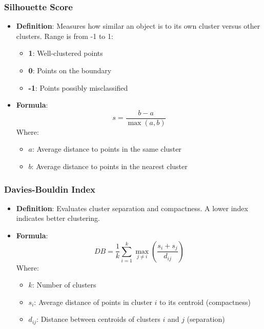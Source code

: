 \documentclass{beamer}
\begin{document}
\begin{frame}[fragile]
    \frametitle{Silhouette Score}
    \begin{itemize}
        \item \textbf{Definition}: Measures how similar an object is to its own cluster versus other clusters. Range is from -1 to 1:
            \begin{itemize}
                \item \textbf{1}: Well-clustered points
                \item \textbf{0}: Points on the boundary
                \item \textbf{-1}: Points possibly misclassified
            \end{itemize}
        \item \textbf{Formula}:
        \begin{equation}
        s = \frac{b - a}{\max(a, b)}
        \end{equation}
        Where:
        \begin{itemize}
            \item \(a\): Average distance to points in the same cluster
            \item \(b\): Average distance to points in the nearest cluster
        \end{itemize}
    \end{itemize}
\end{frame}

\begin{frame}[fragile]
    \frametitle{Davies-Bouldin Index}
    \begin{itemize}
        \item \textbf{Definition}: Evaluates cluster separation and compactness. A lower index indicates better clustering.
        \item \textbf{Formula}:
        \begin{equation}
        DB = \frac{1}{k} \sum_{i=1}^{k} \max_{j \neq i} \left( \frac{s_i + s_j}{d_{ij}} \right)
        \end{equation}
        Where:
        \begin{itemize}
            \item \(k\): Number of clusters
            \item \(s_i\): Average distance of points in cluster \(i\) to its centroid (compactness)
            \item \(d_{ij}\): Distance between centroids of clusters \(i\) and \(j\) (separation)
        \end{itemize}
    \end{itemize}
\end{frame}
\end{document}
